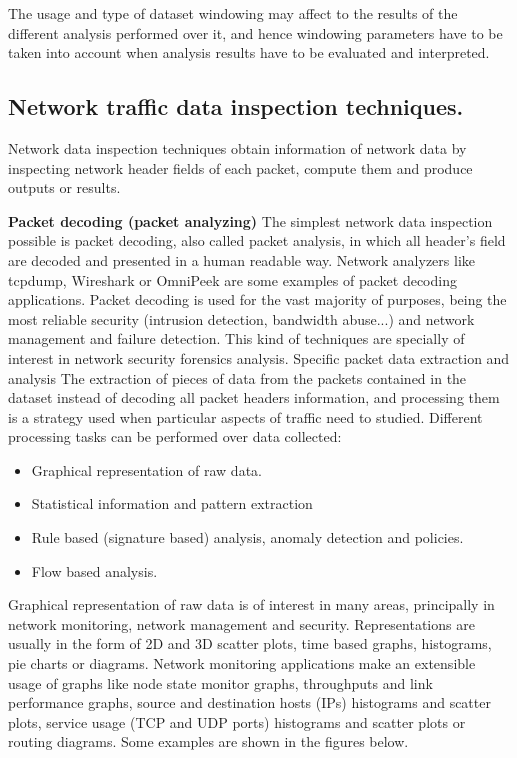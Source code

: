 \documentclass[thesis=M,english]{FITthesis}[2011/07/15]
\begin{document}
The usage and type of dataset windowing may affect to the results of the different analysis performed over it, and hence windowing parameters have to be taken into account when analysis results have to be evaluated and interpreted.

\subsection{Network traffic data inspection techniques.}
Network data inspection techniques obtain information of network data by inspecting network header fields of each packet, compute them and produce outputs or results.

\textbf{Packet decoding (packet analyzing)}
The simplest network data inspection possible is packet decoding, also called packet analysis, in which all header’s field are decoded and presented in a human readable way. Network analyzers like tcpdump, Wireshark or OmniPeek are some examples of packet decoding applications.
Packet decoding is used for the vast majority of purposes, being the most reliable security (intrusion detection, bandwidth abuse...) and network management and failure detection.
This kind of techniques are specially of interest in network security forensics analysis. Specific packet data extraction and analysis The extraction of pieces of data from the packets contained in the dataset instead of decoding all packet headers information, and processing them is a strategy used when particular aspects of traffic need to studied.
Different processing tasks can be performed over data collected:
\begin{itemize}
\item Graphical representation of raw data.
\item Statistical information and pattern extraction
\item Rule based (signature based) analysis, anomaly detection and policies.
\item Flow based analysis.
\end{itemize}
Graphical representation of raw data is of interest in many areas, principally in network monitoring, network management and security. Representations are usually in the form of 2D and 3D scatter plots, time based graphs, histograms, pie charts or diagrams. Network monitoring applications make an extensible usage of graphs like node state monitor graphs, throughputs and link performance graphs, source and destination hosts (IPs) histograms and scatter plots, service usage (TCP and UDP ports) histograms and scatter plots or routing diagrams. Some examples are shown in the figures below.
\end{document}
